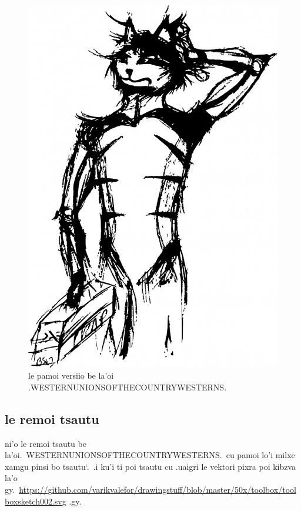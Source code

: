 \documentclass{report}
\newcommand\sds{\spacefactor\sfcode`.\ \space}
\begin{document}
\begin{figure}[ht]
	\centering
	\includegraphics[keepaspectratio, width=\textwidth, height=0.75\textheight]{50x/toolbox/s1v1.jpg}
	\caption[center]{le pamoi versiio be la'oi .WESTERNUNIONSOFTHECOUNTRYWESTERNS.}
\end{figure}
\subsection{le remoi tsautu}
ni'o le remoi tsautu be la'oi.\ WESTERNUNIONSOFTHECOUNTRYWESTERNS.\ cu pamoi lo'i milxe xamgu pinsi bo tsautu\sds  .i ku'i ti poi tsautu cu .uaigri le vektori pixra poi kibzva la'o gy.\ \url{https://github.com/varikvalefor/drawingstuff/blob/master/50x/toolbox/toolboxsketch002.svg} .gy.
\end{document}
